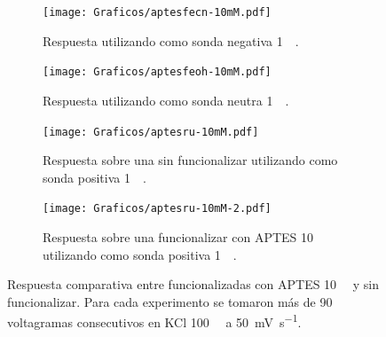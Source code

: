 		  	 \begin{figure}[ht]	
					\begin{subfigure}[t]{0.495\textwidth}
			 	    \texttt{[image: Graficos/aptesfecn-10mM.pdf]}
			        \caption{Respuesta utilizando como sonda negativa \ferroferri\space \SI{1}{\milli\Molar}.}
			        \label{fig:aptes10mM-vc-fe}
			        \end{subfigure}
			        \begin{subfigure}[t]{0.495\textwidth}
			 	    \texttt{[image: Graficos/aptesfeoh-10mM.pdf]}
			        \caption{Respuesta utilizando como sonda neutra \fc\space \SI{1}{\milli\Molar}.}
			        \label{fig:aptes10mM-vc-fc}
			        \end{subfigure}
			       	\begin{subfigure}[t]{0.495\textwidth}
			 	    \vspace*{5mm}
			 	    \texttt{[image: Graficos/aptesru-10mM.pdf]}
			        \caption{Respuesta sobre una \pdmZ\space sin funcionalizar utilizando como sonda positiva \aminorutenio\space \SI{1}{\milli\Molar}.}
			        \label{fig:aptes10mM-vc-ru}
			        \end{subfigure}
			        \begin{subfigure}[t]{0.495\textwidth}
			 	    \vspace*{5mm}
			 	    \texttt{[image: Graficos/aptesru-10mM-2.pdf]}
			        \caption{Respuesta sobre una \pdmZ\space funcionalizar con APTES \SI{10}{\milli\Molar} utilizando como sonda positiva \aminorutenio\space \SI{1}{\milli\Molar}.}
			        \label{fig:aptes10mM-vc-ru-2}
			        \end{subfigure}
			         \caption[Voltagramas de \pdmZ$^P_3$ con \aminorutenio, \fc\space y \ferroferri]{Respuesta comparativa entre \pdmZ\space funcionalizadas con APTES \SI{10}{\milli\Molar} y sin funcionalizar. Para cada experimento se tomaron más de 90 voltagramas consecutivos en KCl \SI{100}{\milli\Molar} a \SI{50}{\milli\volt\per\second}.}
			        \label{fig:aptes10mM-vc}
			      	\end{figure}

		\null
		\vfill		

\let\thispagestyle=\originalstyle